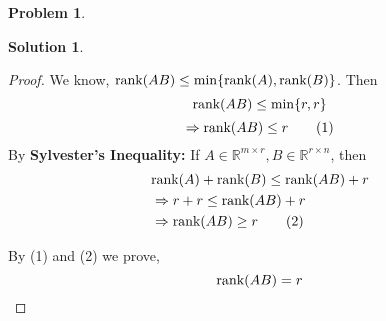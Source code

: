 \documentclass{amsart}[11pt]
\theoremstyle{definition}
\newtheorem{problem}{Problem}
\newtheorem{solution}{Solution}
\newcommand{\R}{\mathbb{R}}
\newcommand{\rank}{\textnormal{rank}}
\begin{document}
\begin{problem}
\begin{solution}
\begin{enumerate}[(a)]
\begin{proof}
            \noindent We know, $\rank(AB) \leq \min\{\rank(A), \rank(B)\}$. Then
            \[\rank(AB) \leq \min\{r, r\}\]
            \[\Rightarrow\rank(AB) \leq r\tag{1}\]
            By \textbf{Sylvester's Inequality:} If $A \in \R^{m\times r}, B \in \R^{r\times n}$, then 
            \begin{align*}
                &\rank(A) + \rank(B) \leq \rank(AB) + r \\
                &\Rightarrow r + r \leq \rank(AB) + r \\
                &\Rightarrow \rank(AB) \geq r \tag{2}
            \end{align*}

            By (1) and (2) we prove,
            \[\rank(AB) = r\]
        \end{proof}
    \end{enumerate}
\end{solution}
\end{problem}
\end{document}
